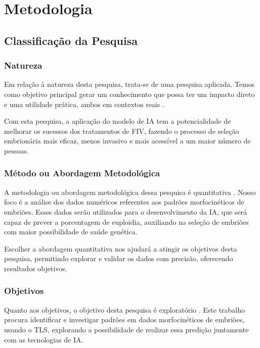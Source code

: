 \chapter[Metodologia]{Metodologia}

\section{Classificação da Pesquisa}

\subsection{Natureza}

Em relação à natureza desta pesquisa, trata-se de uma pesquisa aplicada. Temos como objetivo principal gerar um conhecimento que possa ter um impacto direto e uma utilidade prática, ambos em contextos reais \cite{nascimento2016}. 

Com esta pesquisa, a aplicação do modelo de IA tem a potencialidade de melhorar os sucessos dos tratamentos de FIV, fazendo o processo de seleção embrionária mais eficaz, menos invasivo e mais acessível a um maior número de pessoas.

\subsection{Método ou Abordagem Metodológica}

A metodologia ou abordagem metodológica dessa pesquisa é quantitativa \cite{nascimento2016}. Nosso foco é a análise dos dados numéricos referentes aos padrões morfocinéticos de embriões. Esses dados serão utilizados para o desenvolvimento da IA, que será capaz de prever a porcentagem de euploidia, auxiliando na seleção de embriões com maior possibilidade de saúde genética.

Escolher a abordagem quantitativa nos ajudará a atingir os objetivos desta pesquisa, permitindo explorar e validar os dados com precisão, oferecendo resultados objetivos. 

\subsection{Objetivos}

Quanto aos objetivos, o objetivo desta pesquisa é exploratório \cite{nascimento2016}. Este trabalho procura identificar e investigar padrões em dados morfocinéticos de embriões, usando o TLS, explorando a possibilidade de realizar essa predição juntamente com as tecnologias de IA.

